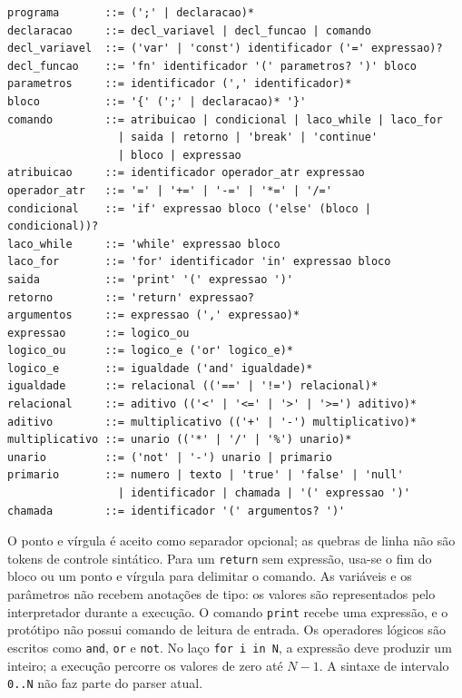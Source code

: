 \documentclass[
    12pt
    ,oneside
    ,a4paper
    ,chapter=TITLE
    ,section=TITLE
    ,sumario=abnt-6027-2012]{abntex2}
\renewcommand{\legenda}[2][]{%
    \centering
    \caption[\MakeTextUppercase{#2}]{\maybeLabel{#1}\MakeTextUppercase{#2}}%
}
\begin{document}
\begin{codigo}[htb]
\legenda[cod:gramatica]{Resumo da gramática EBNF implementada para a linguagem Lumi}
\begin{lstlisting}[language={}]
programa       ::= (';' | declaracao)*
declaracao     ::= decl_variavel | decl_funcao | comando
decl_variavel  ::= ('var' | 'const') identificador ('=' expressao)?
decl_funcao    ::= 'fn' identificador '(' parametros? ')' bloco
parametros     ::= identificador (',' identificador)*
bloco          ::= '{' (';' | declaracao)* '}'
comando        ::= atribuicao | condicional | laco_while | laco_for
                 | saida | retorno | 'break' | 'continue'
                 | bloco | expressao
atribuicao     ::= identificador operador_atr expressao
operador_atr   ::= '=' | '+=' | '-=' | '*=' | '/='
condicional    ::= 'if' expressao bloco ('else' (bloco | condicional))?
laco_while     ::= 'while' expressao bloco
laco_for       ::= 'for' identificador 'in' expressao bloco
saida          ::= 'print' '(' expressao ')'
retorno        ::= 'return' expressao?
argumentos     ::= expressao (',' expressao)*
expressao      ::= logico_ou
logico_ou      ::= logico_e ('or' logico_e)*
logico_e       ::= igualdade ('and' igualdade)*
igualdade      ::= relacional (('==' | '!=') relacional)*
relacional     ::= aditivo (('<' | '<=' | '>' | '>=') aditivo)*
aditivo        ::= multiplicativo (('+' | '-') multiplicativo)*
multiplicativo ::= unario (('*' | '/' | '%') unario)*
unario         ::= ('not' | '-') unario | primario
primario       ::= numero | texto | 'true' | 'false' | 'null'
                 | identificador | chamada | '(' expressao ')'
chamada        ::= identificador '(' argumentos? ')'
\end{lstlisting}
\fonteautor
\end{codigo}

O ponto e vírgula é aceito como separador opcional; as quebras de linha não são tokens de
controle sintático. Para um \texttt{return} sem expressão, usa-se o fim do bloco ou um
ponto e vírgula para delimitar o comando. As variáveis e os parâmetros não recebem anotações
de tipo: os valores são representados pelo interpretador durante a execução. O comando
\texttt{print} recebe uma expressão, e o protótipo não possui comando de leitura de entrada.
Os operadores lógicos são escritos como \texttt{and}, \texttt{or} e \texttt{not}.
No laço \texttt{for i in N}, a expressão deve produzir um inteiro; a execução percorre os
valores de zero até $N-1$. A sintaxe de intervalo \texttt{0..N} não faz parte do parser atual.
\end{document}
